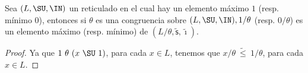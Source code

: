   \begin{corollary}
    \PN Sea $(L, \SU, \IN)$ un reticulado en el cual hay un elemento máximo $1$ (resp. mínimo $0$), entonces si $\theta$
    es una congruencia sobre $(L, \SU, \IN), 1/\theta$ (resp. $0/\theta$) es un elemento máximo (resp. mínimo) de
    $(L/\theta, \mathsf{\tilde{s}}, \mathsf{\tilde{\imath}})$.
  \end{corollary}
  \begin{proof}
    \PN Ya que $1 \ \theta \ (x \ \SU \ 1)$, para cada $x \in L$, tenemos que $x/\theta \ \tilde{\leq} \ 1/\theta$, para
    cada $x \in L$.
  \end{proof}

